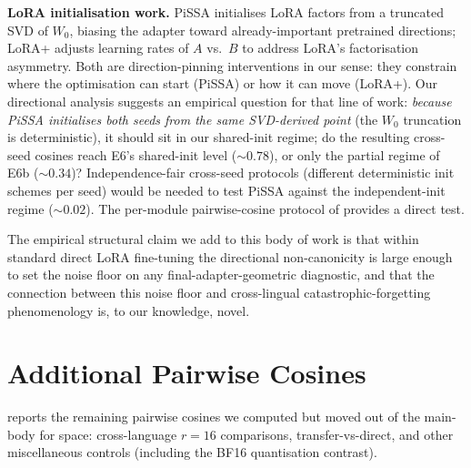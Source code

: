 \documentclass[11pt]{article}
\begin{document}
\textbf{LoRA initialisation work.} PiSSA \citep{meng2024pissa} initialises LoRA factors from a truncated SVD of $W_0$, biasing the adapter toward already-important pretrained directions; LoRA+ \citep{hayou2024loraplus} adjusts learning rates of $A$ vs.\ $B$ to address LoRA's factorisation asymmetry. Both are direction-pinning interventions in our sense: they constrain where the optimisation can start (PiSSA) or how it can move (LoRA+). Our directional analysis suggests an empirical question for that line of work: \emph{because PiSSA initialises both seeds from the same SVD-derived point} (the $W_0$ truncation is deterministic), it should sit in our shared-init regime; do the resulting cross-seed cosines reach E6's shared-init level ($\sim 0.78$), or only the partial regime of E6b ($\sim 0.34$)? Independence-fair cross-seed protocols (different deterministic init schemes per seed) would be needed to test PiSSA against the independent-init regime ($\sim 0.02$). The per-module pairwise-cosine protocol of  provides a direct test.

The empirical structural claim we add to this body of work is that within standard direct LoRA fine-tuning the directional non-canonicity is large enough to set the noise floor on any final-adapter-geometric diagnostic, and that the connection between this noise floor and cross-lingual catastrophic-forgetting phenomenology is, to our knowledge, novel.

\section{Additional Pairwise Cosines}
\label{app:more_cos}

 reports the remaining pairwise cosines we computed but moved out of the main-body  for space: cross-language $r{=}16$ comparisons, transfer-vs-direct, and other miscellaneous controls (including the BF16 quantisation contrast).
\end{document}
